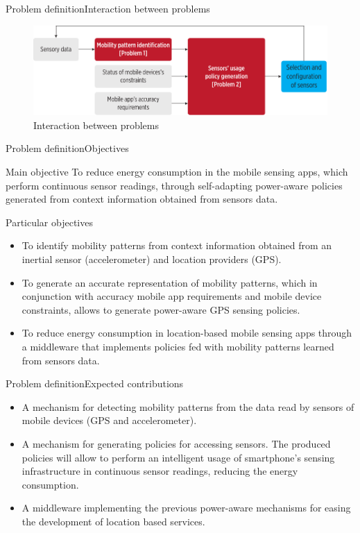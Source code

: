 \documentclass[10pt,xcolor={dvipsnames},handout]{beamer}
\begin{document}
\begin{frame}{Problem definition}{Interaction between problems}
\begin{figure}[tb]
  \centering
  \includegraphics[width=\textwidth]{../../../resources/images/vectors/problems-incorporation}
  \caption{Interaction between problems}
  \label{fig:problems-incorporation}
\end{figure}
\end{frame}

\begin{frame}{Problem definition}{Objectives}
\begin{exampleblock}{Main objective}
To reduce energy consumption in the mobile sensing apps, which perform continuous sensor readings, through self-adapting power-aware policies generated from context information obtained from sensors data.
\end{exampleblock}
\pause
\begin{exampleblock}{Particular objectives}
\small
\begin{itemize}
  \item To identify mobility patterns from context information obtained from an inertial sensor (accelerometer) and location providers (GPS).
  \pause
  \item To generate an accurate representation of mobility patterns, which in conjunction with accuracy mobile app requirements and mobile device constraints, allows to generate power-aware GPS sensing policies.
  \pause
  \item To reduce energy consumption in location-based mobile sensing apps through a middleware that implements policies fed with mobility patterns learned from sensors data.
\end{itemize}
\end{exampleblock}
\end{frame}

\begin{frame}{Problem definition}{Expected contributions}
\begin{itemize}
  \item<+-> A mechanism for detecting mobility patterns from the data read by sensors of mobile devices (GPS and accelerometer).
  \item<+-> A mechanism for generating policies for accessing sensors.
  The produced policies will allow to perform an intelligent usage of smartphone's sensing infrastructure in continuous sensor readings, reducing the energy consumption.
  \item<+-> A middleware implementing the previous power-aware mechanisms for easing the development of location based services.
\end{itemize}
\end{frame}
\end{document}
